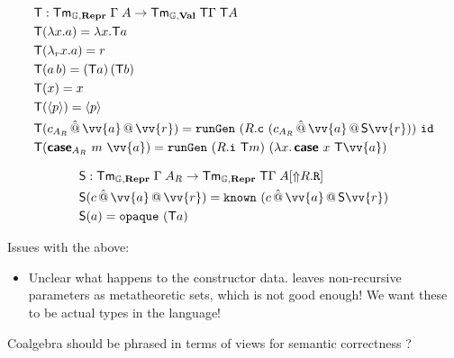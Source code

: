 \begin{align*}
   & \fun T            : \Tm_{\catG, \mR} \; {\Gamma} \; A \to \Tm_{\catG, \mV}\; {\fun T \Gamma} \; \fun T A                                               \\
   & \fun T(\lambda x . a)  = \lambda x . \fun T a                                                                                                          \\
   & \fun T(\lambda_r x . a)  = r                                                                                                                           \\
   & \fun T(a \, b)  = (\fun T a) \, (\fun T b)                                                                                                             \\
   & \fun T(x) = x                                                                                                                                          \\
   & \fun T(\quot {p}) = \quot {p}                                                                                                                          \\
   & \fun T(c_{A_R} \, \hat{@} \, \vv{a} \,@\, \vv{r}) =  \defin{runGen} \ (R.\defin{c} \ (c_{A_R} \, \hat{@} \, \vv{a} \,@\, \fun S \vv{r})) \  \defin{id} \\
   & \fun T(\inte{case}_{A_R}\ m\ \vv{a}) =  \defin{runGen} \ (R.\defin{i} \ \fun T m) \  (\lambda x.\, \inte{case}\ x \ \fun T\vv{a})                      \\
\end{align*}

\begin{align*}
   & \fun S            : \Tm_{\catG, \mR} \; {\Gamma} \; A_R \to \Tm_{\catG,\mR}\; {\fun T \Gamma} \; A[\lift{R.\defin{R}}] \\
   & \fun S(c \, \hat{@} \, \vv{a} \,@\, \vv{r}) = \defin{known}\ (c \, \hat{@} \, \vv{a} \,@\, \fun S\vv{r})               \\
   & \fun S(a)  = \defin{opaque}\ (\fun T a)
\end{align*}

Issues with the above:

\begin{itemize}
  \item Unclear what happens to the constructor data. \cite{Kaposi2020-is} leaves
        non-recursive parameters as metatheoretic sets, which is not good enough! We
        want these to be actual types in the language!
\end{itemize}

Coalgebra should be phrased in terms of views for semantic correctness
\cite{Allais2023-pf,Allais2023-zq} ?
